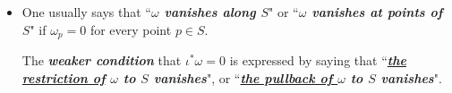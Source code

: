 \documentclass[11pt]{article}
\begin{document}
\begin{itemize}
\item \begin{remark}
One usually says that ``\emph{\textbf{$\omega$ vanishes along $S$}}" or ``\emph{\textbf{$\omega$ vanishes at points of $S$}}"
if $\omega_p = 0$ for every point $p \in S$. 

The \emph{\textbf{weaker condition}} that $\iota^{*}\omega = 0$ is expressed by saying that ``\emph{\textbf{\underline{the restriction of} $\omega$ to $S$ vanishes}}", or ``\emph{\textbf{\underline{the pullback of $\omega$} to $S$ vanishes}}".
\end{remark}

\end{itemize}

\newpage


\end{document}
